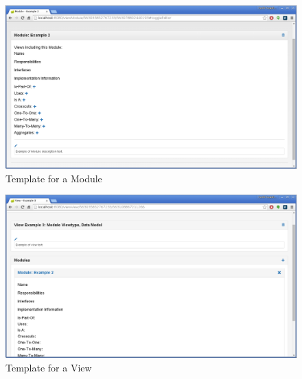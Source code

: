 \begin{figure}
\includegraphics[width=15cm]{images/moduleTemplate}
\centering
\caption{Template for a Module}
\label{figure:moduleTemplate}
\end{figure}

\begin{figure}
\includegraphics[width=15cm]{images/viewTemplate}
\centering
\caption{Template for a View}
\label{figure:viewTemplate}
\end{figure}


